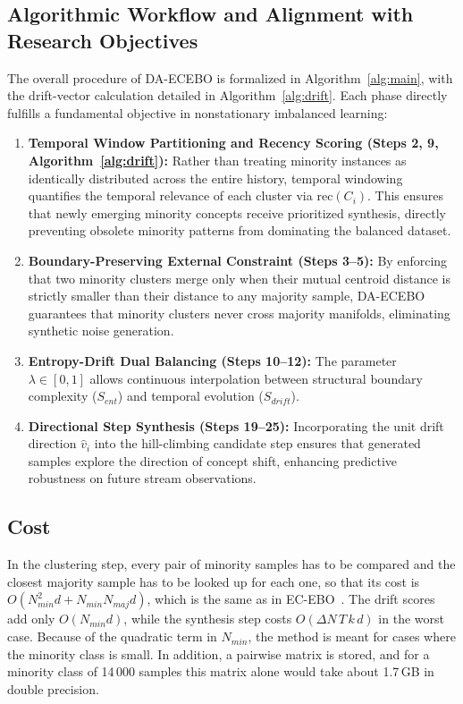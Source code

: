 \documentclass[preprint,10pt]{elsarticle}
\let\OldSubsection\subsection
\renewcommand{\subsection}{\OldSubsection}
\begin{document}
\subsection{Algorithmic Workflow and Alignment with Research Objectives}
The overall procedure of DA-ECEBO is formalized in Algorithm~\ref{alg:main}, with the drift-vector calculation detailed in Algorithm~\ref{alg:drift}. Each phase directly fulfills a fundamental objective in nonstationary imbalanced learning:
\begin{enumerate}[leftmargin=1.5em,label=(\roman*)]
\item \textbf{Temporal Window Partitioning and Recency Scoring (Steps 2, 9, Algorithm~\ref{alg:drift}):} Rather than treating minority instances as identically distributed across the entire history, temporal windowing quantifies the temporal relevance of each cluster via $\mathrm{rec}(C_i)$. This ensures that newly emerging minority concepts receive prioritized synthesis, directly preventing obsolete minority patterns from dominating the balanced dataset.
\item \textbf{Boundary-Preserving External Constraint (Steps 3--5):} By enforcing that two minority clusters merge only when their mutual centroid distance is strictly smaller than their distance to any majority sample, DA-ECEBO guarantees that minority clusters never cross majority manifolds, eliminating synthetic noise generation.
\item \textbf{Entropy-Drift Dual Balancing (Steps 10--12):} The parameter $\lambda \in [0, 1]$ allows continuous interpolation between structural boundary complexity ($S_{ent}$) and temporal evolution ($S_{drift}$).
\item \textbf{Directional Step Synthesis (Steps 19--25):} Incorporating the unit drift direction $\hat{v}_i$ into the hill-climbing candidate step ensures that generated samples explore the direction of concept shift, enhancing predictive robustness on future stream observations.
\end{enumerate}

\subsection{Cost}
In the clustering step, every pair of minority samples has to be compared and the closest majority sample has to be looked up for each one, so that its cost is $O(N_{min}^2d+N_{min}N_{maj}d)$, which is the same as in EC-EBO~\cite{tao2026}. The drift scores add only $O(N_{min}d)$, while the synthesis step costs $O(\Delta N\,T\,k\,d)$ in the worst case. Because of the quadratic term in $N_{min}$, the method is meant for cases where the minority class is small. In addition, a pairwise matrix is stored, and for a minority class of 14\,000 samples this matrix alone would take about 1.7\,GB in double precision.
\end{document}
